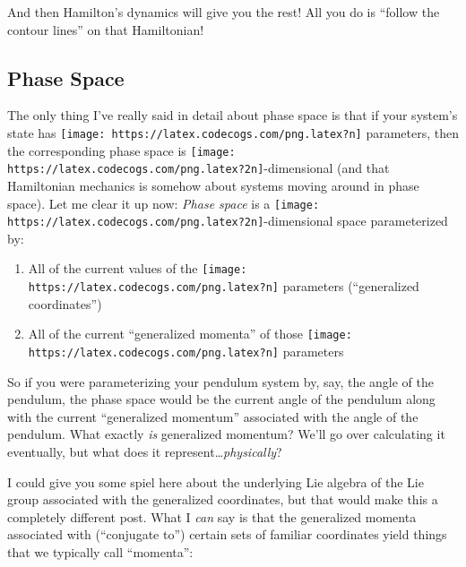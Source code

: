 \documentclass[]{article}
\begin{document}
And then Hamilton's dynamics will give you the rest! All you do is ``follow the
contour lines'' on that Hamiltonian!

\subsection{Phase Space}\label{phase-space}

The only thing I've really said in detail about phase space is that if your
system's state has \texttt{[image: https://latex.codecogs.com/png.latex?n]}
parameters, then the corresponding phase space is
\texttt{[image: https://latex.codecogs.com/png.latex?2n]}-dimensional (and that
Hamiltonian mechanics is somehow about systems moving around in phase space).
Let me clear it up now: \emph{Phase space} is a
\texttt{[image: https://latex.codecogs.com/png.latex?2n]}-dimensional space
parameterized by:

\begin{enumerate}
\def\labelenumi{\arabic{enumi}.}
\tightlist
\item
  All of the current values of the
  \texttt{[image: https://latex.codecogs.com/png.latex?n]} parameters
  (``generalized coordinates'')
\item
  All of the current ``generalized momenta'' of those
  \texttt{[image: https://latex.codecogs.com/png.latex?n]} parameters
\end{enumerate}

So if you were parameterizing your pendulum system by, say, the angle of the
pendulum, the phase space would be the current angle of the pendulum along with
the current ``generalized momentum'' associated with the angle of the pendulum.
What exactly \emph{is} generalized momentum? We'll go over calculating it
eventually, but what does it represent\ldots{}\emph{physically}?

I could give you some spiel here about the underlying Lie algebra of the Lie
group associated with the generalized coordinates, but that would make this a
completely different post. What I \emph{can} say is that the generalized momenta
associated with (``conjugate to'') certain sets of familiar coordinates yield
things that we typically call ``momenta'':
\end{document}
